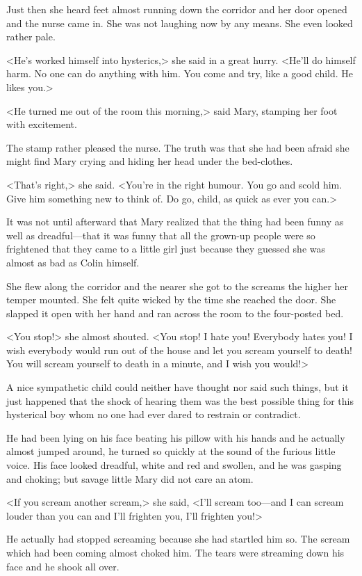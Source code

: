 Just then she heard feet almost running down the corridor and her door opened and the nurse came in. She was not laughing now by any means. She even looked rather pale.

<He's worked himself into hysterics,> she said in a great hurry. <He'll do himself harm. No one can do anything with him. You come and try, like a good child. He likes you.>

<He turned me out of the room this morning,> said Mary, stamping her foot with excitement.

The stamp rather pleased the nurse. The truth was that she had been afraid she might find Mary crying and hiding her head under the bed-clothes.

<That's right,> she said. <You're in the right humour. You go and scold him. Give him something new to think of. Do go, child, as quick as ever you can.>

It was not until afterward that Mary realized that the thing had been funny as well as dreadful—that it was funny that all the grown-up people were so frightened that they came to a little girl just because they guessed she was almost as bad as Colin himself.

She flew along the corridor and the nearer she got to the screams the higher her temper mounted. She felt quite wicked by the time she reached the door. She slapped it open with her hand and ran across the room to the four-posted bed.

<You stop!> she almost shouted. <You stop! I hate you! Everybody hates you! I wish everybody would run out of the house and let you scream yourself to death! You will scream yourself to death in a minute, and I wish you would!>

A nice sympathetic child could neither have thought nor said such things, but it just happened that the shock of hearing them was the best possible thing for this hysterical boy whom no one had ever dared to restrain or contradict.

He had been lying on his face beating his pillow with his hands and he actually almost jumped around, he turned so quickly at the sound of the furious little voice. His face looked dreadful, white and red and swollen, and he was gasping and choking; but savage little Mary did not care an atom.

<If you scream another scream,> she said, <I'll scream too—and I can scream louder than you can and I'll frighten you, I'll frighten you!>

He actually had stopped screaming because she had startled him so. The scream which had been coming almost choked him. The tears were streaming down his face and he shook all over.

